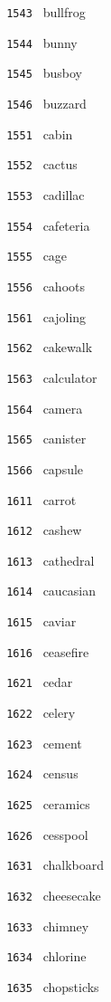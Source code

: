 \documentclass[11pt]{article}
\begin{document}
\begin{multicols}{6}
\noindent \texttt{ 1543 } bullfrog  \par
\noindent \texttt{ 1544 } bunny  \par
\noindent \texttt{ 1545 } busboy  \par
\noindent \texttt{ 1546 } buzzard  \par
\noindent \texttt{ 1551 } cabin  \par
\noindent \texttt{ 1552 } cactus  \par
\noindent \texttt{ 1553 } cadillac  \par
\noindent \texttt{ 1554 } cafeteria  \par
\noindent \texttt{ 1555 } cage  \par
\noindent \texttt{ 1556 } cahoots  \par
\noindent \texttt{ 1561 } cajoling  \par
\noindent \texttt{ 1562 } cakewalk  \par
\noindent \texttt{ 1563 } calculator  \par
\noindent \texttt{ 1564 } camera  \par
\noindent \texttt{ 1565 } canister  \par
\noindent \texttt{ 1566 } capsule  \par
\noindent \texttt{ 1611 } carrot  \par
\noindent \texttt{ 1612 } cashew  \par
\noindent \texttt{ 1613 } cathedral  \par
\noindent \texttt{ 1614 } caucasian  \par
\noindent \texttt{ 1615 } caviar  \par
\noindent \texttt{ 1616 } ceasefire  \par
\noindent \texttt{ 1621 } cedar  \par
\noindent \texttt{ 1622 } celery  \par
\noindent \texttt{ 1623 } cement  \par
\noindent \texttt{ 1624 } census  \par
\noindent \texttt{ 1625 } ceramics  \par
\noindent \texttt{ 1626 } cesspool  \par
\noindent \texttt{ 1631 } chalkboard  \par
\noindent \texttt{ 1632 } cheesecake  \par
\noindent \texttt{ 1633 } chimney  \par
\noindent \texttt{ 1634 } chlorine  \par
\noindent \texttt{ 1635 } chopsticks  \par

\end{multicols}
\end{document}
